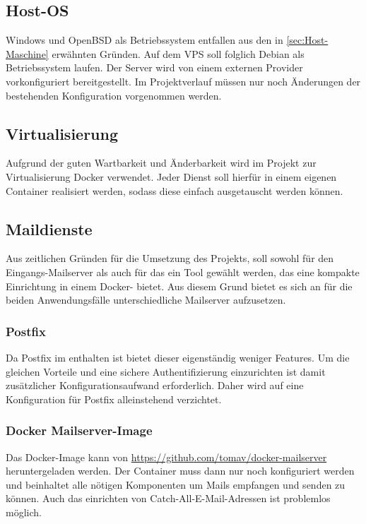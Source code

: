 \documentclass[a4paper,11pt,singlespacing]{article}
\begin{document}
	\subsection{Host-OS}\label{sec:AuswahlLösungHost-Maschine}
		Windows und OpenBSD als Betriebssystem entfallen aus den in \autoref{sec:Host-Maschine} erwähnten Gründen.
		Auf dem VPS soll folglich Debian als Betriebssystem laufen.
		Der Server wird von einem externen Provider vorkonfiguriert bereitgestellt.
		Im Projektverlauf müssen nur noch Änderungen der bestehenden Konfiguration vorgenommen werden.

	\subsection{Virtualisierung}\label{sec:AuswahlLösungVirtualisierung}
		Aufgrund der guten Wartbarkeit und Änderbarkeit wird im Projekt zur Virtualisierung Docker verwendet.
		Jeder Dienst soll hierfür in einem eigenen Container realisiert werden, sodass diese einfach ausgetauscht werden können.

	\subsection{Maildienste}\label{sec:AuswahlLösungMailserver}
		Aus zeitlichen Gründen für die Umsetzung des Projekts, soll sowohl für den Eingangs-Mailserver als auch für das  ein Tool gewählt werden, das eine kompakte Einrichtung in einem Docker- bietet.
		Aus diesem Grund bietet es sich an für die beiden Anwendungsfälle unterschiedliche Mailserver aufzusetzen.

		\subsubsection{Postfix}\label{sec:AuswahlLösungPostfix}	
			Da Postfix im  enthalten ist bietet dieser eigenständig weniger Features.
			Um die gleichen Vorteile und eine sichere Authentifizierung einzurichten ist damit zusätzlicher Konfigurationsaufwand erforderlich.
			Daher wird auf eine Konfiguration für Postfix alleinstehend verzichtet.

		\subsubsection{Docker Mailserver-Image}\label{sec:AuswahlLösungVorkonfigurierterDockerMailserver}
			Das Docker-Image kann von \url{https://github.com/tomav/docker-mailserver} heruntergeladen werden.
			Der Container muss dann nur noch konfiguriert werden und beinhaltet alle nötigen Komponenten um Mails empfangen und senden zu können.
			Auch das einrichten von Catch-All-E-Mail-Adressen ist problemlos möglich.
\end{document}
